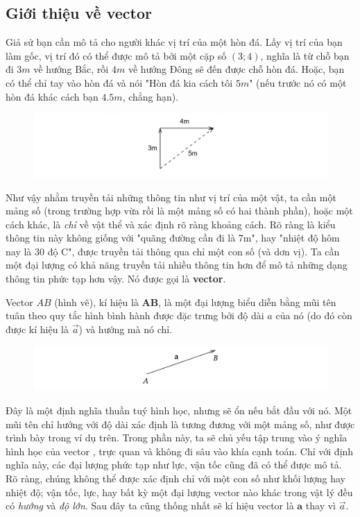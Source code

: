 \subsection{Giới thiệu về vector}
Giả sử bạn cần mô tả cho người khác vị trí của một hòn đá. Lấy vị trí của bạn làm gốc, vị trí đó có thể được mô tả bởi một cặp số \((3;4)\), nghĩa là từ chỗ bạn đi \(3m\) về hướng Bắc, rồi \(4m\) về hướng Đông sẽ đến được chỗ hòn đá. Hoặc, bạn có thể chỉ tay vào hòn đá và nói "Hòn đá kia cách tôi \(5m\)" (nếu trước nó có một hòn đá khác cách bạn \(4.5m\), chẳng hạn). 
\begin{figure}[H]
\centering
\includegraphics[width=1\textwidth]{Tuan2/Figures/gioithieuvector.png}
\end{figure}
Như vậy nhằm truyền tải những thông tin như vị trí của một vật, ta cần một mảng số (trong trường hợp vừa rồi là một mảng số có hai thành phần), hoặc một cách khác, là \emph{chỉ} về vật thể và xác định rõ ràng khoảng cách. Rõ ràng là kiểu thông tin này không giống với "quãng đường cần đi là 7m", hay "nhiệt độ hôm nay là 30 độ C", được truyền tải thông qua chỉ một con số (và dơn vị). Ta cần một đại lượng có khả năng truyền tải nhiều thông tin hơn để mô tả những 
dạng thông tin phức tạp hơn vậy. Nó được gọi là \textbf{vector}.
\begin{definition} Vector \(AB\) (hình vẽ), kí hiệu là \(\mathbf{AB}\), là một đại lượng biểu diễn bằng mũi tên tuân theo quy tắc hình bình hành được đặc trưng bởi độ dài \(a\) của nó (do đó còn được kí hiệu là \(\vec{a}\)) và hướng mà nó chỉ.
\end{definition}
\begin{figure}[H]
\centering
\includegraphics[width=1\textwidth]{Tuan2/Figures/vectorAB.png}
\end{figure}Đây là một định nghĩa thuần tuý hình học, nhưng sẽ ổn nếu bắt đầu với nó. Một mũi tên chỉ hướng với độ dài xác định là tương đương với một mảng số, như được trình bày trong ví dụ trên. Trong phần này, ta sẽ chủ yếu tập trung vào ý nghĩa hình học của vector , trực quan và không đi sâu vào khía cạnh toán.
Chỉ với định nghĩa này, các đại lượng phức tạp như lực, vận tốc cũng đã có thể được mô tả. Rõ ràng, chúng không thể được xác định chỉ với một con số như khối lượng hay nhiệt độ; vận tốc, lực, hay bất kỳ một đại lượng vector nào khác trong vật lý đều có \emph{hướng} và \emph{độ lớn}. Sau đây ta cũng thống nhất sẽ kí hiệu vector là \(\mathbf{a}\) thay vì \(\vec a\).
\vspace{8pt}

